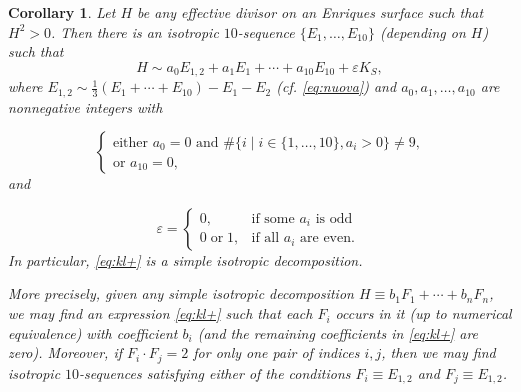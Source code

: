 \documentclass[11pt]{amsart}
\newtheorem{corollary}[thm]{Corollary}
\theoremstyle{definition}
\begin{document}
\begin{corollary} \label{cor:kl+}
  Let $H$ be any effective divisor on an Enriques surface such that $H^2 >0$. Then there is an isotropic $10$-sequence $\{E_1,\ldots,E_{10}\}$ (depending on $H$) such that
\begin{equation} \label{eq:kl+}
 H  \sim  a_0E_{1,2}+a_1E_1 + \cdots + a_{10}E_{10}+\varepsilon K_S, 
\end{equation}
where $E_{1,2}  \sim  \frac{1}{3}\left(E_1+\cdots+E_{10}\right)-E_1-E_2$ (cf. \color{black} \eqref{eq:nuova}\color{black}) and $a_0,a_1, \ldots, a_{10}$
are nonnegative integers  with

\begin{equation}
\begin{cases}
 \mbox{either $a_0=0$ and $\#\{i \; | \; i \in \{1,\ldots,10\}, a_i>0\} \neq 9$,} \\
\label{eq:conda010} 
\mbox{or $a_{10}=0$,} 
\end{cases}
\end{equation}
 and

\begin{equation} \label{eq:eps}
\varepsilon= \begin{cases} 0, & \mbox{if some $a_i$ is odd} \\
0 \; \mbox{or} \; 1, & \mbox{if all $a_i$ are even.} \
\end{cases}
\end{equation} 
 In particular, \eqref{eq:kl+} is a simple isotropic decomposition. 


More precisely,  given any simple isotropic decomposition 
$H \equiv b_1F_1+\cdots+b_nF_{n}$,
we may find an expression \eqref{eq:kl+} such that each $F_i$ occurs in it (up to numerical equivalence) with coefficient $b_i$ (and the remaining coefficients in \eqref{eq:kl+} are zero).  Moreover, if $F_i \cdot F_j=2$ for only one pair of indices $i,j$, then we may find isotropic $10$-sequences satisfying either of the conditions $F_i \equiv E_{1,2}$ and $F_j \equiv E_{1,2}$. 
\end{corollary}
\end{document}
